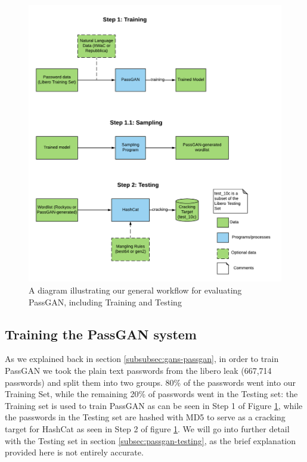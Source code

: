 \begin{figure}[H]
\centering
    \includegraphics[scale=0.7]{figures/testing_flowchart_ocd.png}
    \caption{A diagram illustrating our general workflow for evaluating PassGAN, including Training and Testing}
    \label{fig:testing_flowchart}
\end{figure}    

\subsection{Training the PassGAN system}\label{subsec:passgan-training}
As we explained back in section \ref{subsubsec:gans-passgan}, in order to train PassGAN we took the plain text passwords from the libero leak (667,714 passwords) and split them into two groups. 80\% of the passwords went into our Training Set, while the remaining 20\% of passwords went in the Testing set: the Training set is used to train PassGAN as can be seen in Step 1 of Figure \ref{fig:testing_flowchart}, while the passwords in the Testing set are hashed with MD5 to serve as a cracking target for HashCat as seen in Step 2 of figure \ref{fig:testing_flowchart}. We will go into further detail with the Testing set in section \ref{subsec:passgan-testing}, as the brief explanation provided here is not entirely accurate.

